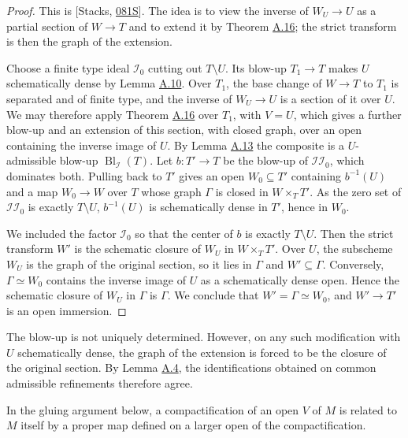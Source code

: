 \documentclass[11pt]{article}
\begin{document}
\begin{proof}[{Proof}]\label{bp47}%
This is [Stacks, \href{https://stacks.math.columbia.edu/tag/081S}{081S}]. The idea is to view the inverse of \(W_U\to U\) as a partial section of \(W\to T\) and to extend it by Theorem \hyperref[bp41]{A.16}; the strict transform is then the graph of the extension.

Choose a finite type ideal \(\mathcal I_0\) cutting out \(T\setminus U\). Its blow-up \(T_1\to T\) makes \(U\) schematically dense by Lemma \hyperref[bp27]{A.10}. Over \(T_1\), the base change of \(W\to T\) to \(T_1\) is separated and of finite type, and the inverse of \(W_U\to U\) is a section of it over \(U\). We may therefore apply Theorem \hyperref[bp41]{A.16} over \(T_1\), with \(V=U\), which gives a further blow-up and an extension of this section, with closed graph, over an open containing the inverse image of \(U\). By Lemma \hyperref[bp33]{A.13} the composite is a \(U\)-admissible blow-up \(\operatorname{Bl}_{\mathcal I}(T)\). Let \(b:T'\to T\) be the blow-up of \(\mathcal I\mathcal I_0\), which dominates both. Pulling back to \(T'\) gives an open \(W_0\subseteq T'\) containing \(b^{-1}(U)\) and a map \(W_0\to W\) over \(T\) whose graph \(\Gamma\) is closed in \(W\times_TT'\). As the zero set of \(\mathcal I\mathcal I_0\) is exactly \(T\setminus U\), \(b^{-1}(U)\) is schematically dense in \(T'\), hence in \(W_0\).

We included the factor \(\mathcal I_0\) so that the center of \(b\) is exactly \(T\setminus U\). Then the strict transform \(W'\) is the schematic closure of \(W_U\) in \(W\times_TT'\). Over \(U\), the subscheme \(W_U\) is the graph of the original section, so it lies in \(\Gamma\) and \(W'\subseteq\Gamma\). Conversely, \(\Gamma\simeq W_0\) contains the inverse image of \(U\) as a schematically dense open. Hence the schematic closure of \(W_U\) in \(\Gamma\) is \(\Gamma\). We conclude that \(W'=\Gamma\simeq W_0\), and \(W'\to T'\) is an open immersion.
\end{proof}

\label{bp48}%
The blow-up is not uniquely determined. However, on any such modification with \(U\) schematically dense, the graph of the extension is forced to be the closure of the original section. By Lemma \hyperref[bp12]{A.4}, the identifications obtained on common admissible refinements therefore agree.

In the gluing argument below, a compactification of an open \(V\) of \(M\) is related to \(M\) itself by a proper map defined on a larger open of the compactification.
\end{document}
